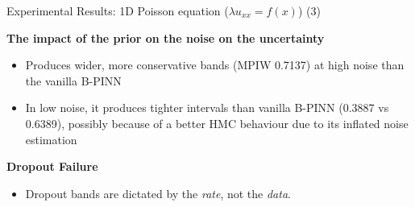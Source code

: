 \documentclass[10pt, aspectratio=169]{beamer}
\begin{document}
\begin{frame}{Experimental Results: 1D Poisson equation ($\lambda u_{xx} = f(x)$) (3)}

  
\begin{table}[h]
\centering
{}
\caption{\tiny Metrics for the 1D poisson equation forward problem with measurement noise 0.1}
\label{tab:5x5}
\end{table}



\begin{table}[h]
\centering
{}
\caption{ \tiny Metrics for the 1D poisson equation forward problem with measurement noise 0.01}
\label{tab:5x5}
\end{table}




\textbf{The impact of the prior on the noise on the uncertainty}
    \begin{itemize}
        \item Produces wider, more conservative bands (MPIW 0.7137) at high noise than the vanilla B-PINN
        \item In low noise, it produces tighter intervals than vanilla B-PINN (0.3887 vs 0.6389), possibly because of a better HMC behaviour due to its inflated noise estimation
    \end{itemize}
\textbf{Dropout Failure}
\begin{itemize}
    \item  Dropout bands are dictated by the \textit{rate}, not the \textit{data}.
    \end{itemize}
\end{frame}
\end{document}
